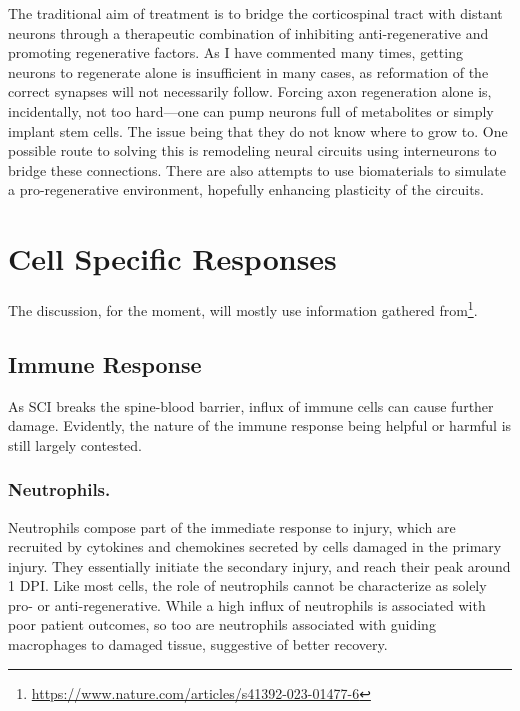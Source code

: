 The traditional aim of treatment is to bridge the corticospinal tract with distant neurons through a therapeutic combination of inhibiting anti-regenerative and promoting regenerative factors. As I have commented many times, getting neurons to regenerate alone is insufficient in many cases, as reformation of the correct synapses will not necessarily follow. Forcing axon regeneration alone is, incidentally, not too hard---one can pump neurons full of metabolites or simply implant stem cells. The issue being that they do not know where to grow to. One possible route to solving this is remodeling neural circuits using interneurons to bridge these connections. There are also attempts to use biomaterials to simulate a pro-regenerative environment, hopefully enhancing plasticity of the circuits.\newline


\section{Cell Specific Responses}

\label{sec:Cell-Specific-Responses}

The discussion, for the moment, will mostly use information gathered from\footnote{\url{https://www.nature.com/articles/s41392-023-01477-6}}.


\subsection{Immune Response}
As SCI breaks the spine-blood barrier, influx of immune cells can cause further damage. Evidently, the nature of the immune response being helpful or harmful is still largely contested.

\subsubsection{Neutrophils.}
Neutrophils compose part of the immediate response to injury, which are recruited by cytokines and chemokines secreted by cells damaged in the primary injury. They essentially initiate the secondary injury, and reach their peak around 1 DPI. Like most cells, the role of neutrophils cannot be characterize as solely pro- or anti-regenerative. While a high influx of neutrophils is associated with poor patient outcomes, so too are neutrophils associated with guiding macrophages to damaged tissue, suggestive of better recovery. 

